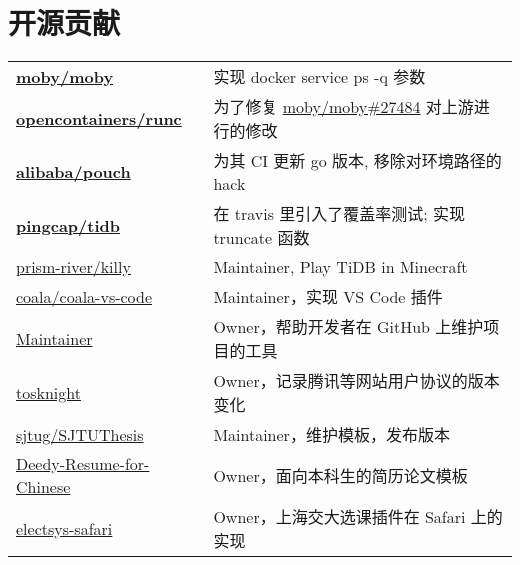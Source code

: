 \documentclass[]{deedy-resume-openfont}
\begin{document}
\begin{minipage}[t]{0.68\textwidth}


\section{开源贡献}
\begin{tabular}{ll}
\href{https://github.com/moby/moby/commits?author=gaocegege}{\bf moby/moby} & 实现 docker service ps -q 参数 \\
\href{https://github.com/opencontainers/runc/commits?author=gaocegege}{\bf opencontainers/runc} & 为了修复 \href{https://github.com/moby/moby/issues/27484}{moby/moby\#27484} 对上游进行的修改 \\
\href{https://github.com/alibaba/pouch/commits?author=gaocegege}{\bf  alibaba/pouch} & 为其 CI 更新 go 版本, 移除对环境路径的 hack \\
\href{https://github.com/pingcap/tidb/commits?author=gaocegege}{\bf pingcap/tidb} & 在 travis 里引入了覆盖率测试; 实现 truncate 函数 \\
\href{https://github.com/prism-river/killy}{prism-river/killy} & Maintainer, Play TiDB in Minecraft \\
\href{https://github.com/coala/coala-vs-code/commits/master?author=gaocegege}{coala/coala-vs-code} & Maintainer，实现 VS Code 插件 \\
\href{https://github.com/gaocegege/maintainer}{Maintainer} & Owner，帮助开发者在 GitHub 上维护项目的工具 \\
\href{https://github.com/siglt/tosknight}{tosknight} & Owner，记录腾讯等网站用户协议的版本变化 \\
\href{https://github.com/sjtug/SJTUThesis/commits?author=gaocegege}{sjtug/SJTUThesis} & Maintainer，维护模板，发布版本 \\
\href{https://github.com/dyweb/Deedy-Resume-for-Chinese}{Deedy-Resume-for-Chinese} & Owner，面向本科生的简历论文模板 \\
\href{https://github.com/dyweb/electsys-safari}{electsys-safari} & Owner，上海交大选课插件在 Safari 上的实现 \\
\end{tabular}
\sectionsep



\end{minipage}
\end{document}
